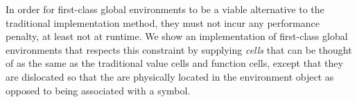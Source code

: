 In order for first-class global environments to be a viable
alternative to the traditional implementation method, they must not
incur any performance penalty, at least not at runtime.  We show an
implementation of first-class global environments that respects this
constraint by supplying \emph{cells} that can be thought of as the
same as the traditional value cells and function cells, except that
they are dislocated so that the are physically located in the
environment object as opposed to being associated with a symbol.

